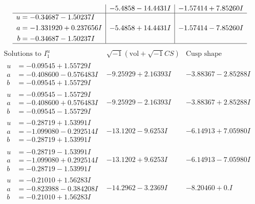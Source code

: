 \documentclass[1p]{elsarticle_modified}
\theoremstyle{definition}
\newcommand{\I}{\sqrt{-1}}
\begin{document}
$$\begin{array}{c|c|c}
 & -5.4858 - 14.4431 I & -1.57414 + 7.85260 I \\ \hline\begin{aligned}
u &= -0.34687 - 1.50237 I \\
a &= -1.331920 + 0.237656 I \\
b &= -0.34687 - 1.50237 I\end{aligned}
 & -5.4858 + 14.4431 I & -1.57414 - 7.85260 I\\
 \hline 
 \end{array}$$\newpage$$\begin{array}{c|c|c}  
\text{Solutions to }I^u_{1}& \I (\text{vol} + \sqrt{-1}CS) & \text{Cusp shape}\\
 \hline 
\begin{aligned}
u &= -0.09545 + 1.55729 I \\
a &= -0.408600 - 0.576483 I \\
b &= -0.09545 + 1.55729 I\end{aligned}
 & -9.25929 + 2.16393 I & -3.88367 - 2.85288 I \\ \hline\begin{aligned}
u &= -0.09545 - 1.55729 I \\
a &= -0.408600 + 0.576483 I \\
b &= -0.09545 - 1.55729 I\end{aligned}
 & -9.25929 - 2.16393 I & -3.88367 + 2.85288 I \\ \hline\begin{aligned}
u &= -0.28719 + 1.53991 I \\
a &= -1.099080 - 0.292514 I \\
b &= -0.28719 + 1.53991 I\end{aligned}
 & -13.1202 - 9.6253 I & -6.14913 + 7.05980 I \\ \hline\begin{aligned}
u &= -0.28719 - 1.53991 I \\
a &= -1.099080 + 0.292514 I \\
b &= -0.28719 - 1.53991 I\end{aligned}
 & -13.1202 + 9.6253 I & -6.14913 - 7.05980 I \\ \hline\begin{aligned}
u &= -0.21010 + 1.56283 I \\
a &= -0.823988 - 0.384208 I \\
b &= -0.21010 + 1.56283 I\end{aligned}
 & -14.2962 - 3.2369 I & -8.20460 + 0. I\phantom{ +0.000000I} \\ \hline\begin{aligned}

\end{aligned}
\end{array}$$
\end{document}
